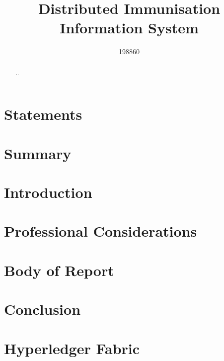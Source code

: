 \documentclass{report}
\title{Distributed Immunisation Information System}
\author{198860}
\begin{document}


\begin{abstract}
..
\end{abstract}

\begin{flushleft}

\chapter{Statements}


\chapter{Summary}


\tableofcontents

\listoffigures

\chapter{Introduction}


\chapter{Professional Considerations}


\chapter{Body of Report}


\chapter{Conclusion}


\printbibliography

\appendix
\chapter{Hyperledger Fabric}



\end{flushleft}
\end{document}
